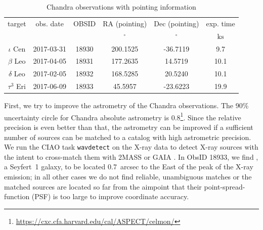 \documentclass[linenumbers]{aastex631}
\begin{document}
\begin{table}
\caption{Chandra observations with pointing information \label{tab:obslog}}
\begin{tabular}{cccccc}
\hline \hline
target & obs. date & OBSID & RA (pointing) & Dec (pointing) & exp. time \\
 &  &  & $\mathrm{{}^{\circ}}$ & $\mathrm{{}^{\circ}}$ & $\mathrm{ks}$ \\
\hline
$\iota$ Cen & 2017-03-31 & 18930 & 200.1525 & -36.7119 & 9.7 \\
$\beta$ Leo & 2017-04-05 & 18931 & 177.2635 & 14.5719 & 10.1 \\
$\delta$ Leo & 2017-02-05 & 18932 & 168.5285 & 20.5240 & 10.1 \\
$\tau^3$ Eri & 2017-06-09 & 18933 & 45.5957 & -23.6223 & 19.9 \\
\hline
\end{tabular}
\end{table}
First, we try to improve the astrometry of the Chandra observations.
The 90\% uncertainty circle for Chandra absolute astrometry is
0.8\arcsec\footnote{\url{https://cxc.cfa.harvard.edu/cal/ASPECT/celmon/}}. Since
the relative precision is even better than that, the astrometry can be
improved if a sufficient number of sources can be matched to a catalog
with high astrometric precision. We run the CIAO task \texttt{wavdetect} on the
X-ray data to detect X-ray sources with the intent to cross-match them
with 2MASS \citep{2006AJ....131.1163S} or GAIA
\citep{2016A&A...595A...1G,2018A&A...616A...1G}.
In ObsID 18933, we find , a Seyfert~1 galaxy, to be located 0.7~arcsec to the East of the peak of the X-ray emission; in all other cases we do not find reliable, unambiguous matches or the matched sources are located so far from the aimpoint that their point-spread-function (PSF) is too large to improve coordinate accuracy.
\end{document}
